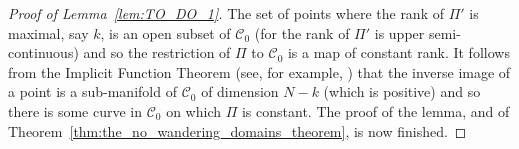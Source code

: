 \begin{proof}[Proof of Lemma~\ref{lem:TO_DO_1}]
    The set of points where the rank of $\Pi'$ is maximal, say $k$, is an open
    subset of $\mathscr{C}_0$ (for the rank of $\Pi'$ is upper semi-continuous)
    and so the restriction of $\Pi$ to $\mathscr{C}_0$ is a map of constant
    rank. It follows from the Implicit Function Theorem (see, for example,
    \cite[79]{Boothby2003}) that the inverse image of a point is a sub-manifold
    of $\mathscr{C}_0$ of dimension $N - k$ (which is positive) and so there is
    some curve in $\mathscr{C}_0$ on which $\Pi$ is constant. The proof of the
    lemma, and of Theorem~\ref{thm:the_no_wandering_domains_theorem}, is now
    finished.
\end{proof}